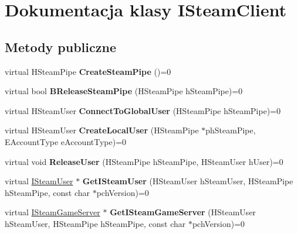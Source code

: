 \hypertarget{class_i_steam_client}{}\section{Dokumentacja klasy I\+Steam\+Client}
\label{class_i_steam_client}
\subsection*{Metody publiczne}
\begin{DoxyCompactItemize}
\item 
\mbox{\label{class_i_steam_client_af1a132da5595a07c840d0d9bb64fd1d0}} 
virtual H\+Steam\+Pipe {\bfseries Create\+Steam\+Pipe} ()=0
\item 
\mbox{\label{class_i_steam_client_a0e01d600680fc53fc8d853abb2e5127c}} 
virtual bool {\bfseries B\+Release\+Steam\+Pipe} (H\+Steam\+Pipe h\+Steam\+Pipe)=0
\item 
\mbox{\label{class_i_steam_client_a0555d20dc6895a73e4720f9cc600785a}} 
virtual H\+Steam\+User {\bfseries Connect\+To\+Global\+User} (H\+Steam\+Pipe h\+Steam\+Pipe)=0
\item 
\mbox{\label{class_i_steam_client_a193afd8a8935c529fc858f915501e4ea}} 
virtual H\+Steam\+User {\bfseries Create\+Local\+User} (H\+Steam\+Pipe $\ast$ph\+Steam\+Pipe, E\+Account\+Type e\+Account\+Type)=0
\item 
\mbox{\label{class_i_steam_client_a2b7b04158cd24d62c20c90cb6a15012e}} 
virtual void {\bfseries Release\+User} (H\+Steam\+Pipe h\+Steam\+Pipe, H\+Steam\+User h\+User)=0
\item 
\mbox{\label{class_i_steam_client_acb544ee18aa49b7437a0ab41d5daa172}} 
virtual \hyperlink{class_i_steam_user}{I\+Steam\+User} $\ast$ {\bfseries Get\+I\+Steam\+User} (H\+Steam\+User h\+Steam\+User, H\+Steam\+Pipe h\+Steam\+Pipe, const char $\ast$pch\+Version)=0
\item 
\mbox{\label{class_i_steam_client_a2bbffcddb8783778ab163d0c1f382d68}} 
virtual \hyperlink{class_i_steam_game_server}{I\+Steam\+Game\+Server} $\ast$ {\bfseries Get\+I\+Steam\+Game\+Server} (H\+Steam\+User h\+Steam\+User, H\+Steam\+Pipe h\+Steam\+Pipe, const char $\ast$pch\+Version)=0

\end{DoxyCompactItemize}
